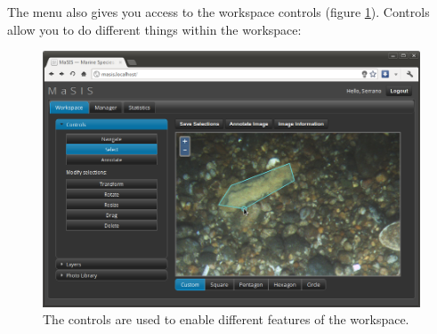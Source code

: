\documentclass[twoside,a4paper]{refart}
\begin{document}
The menu also gives you access to the workspace controls (figure \ref{fig:masis-controls}). Controls allow you to do different things within the workspace:

\begin{figure}[hbtp]
\centering
\includegraphics[width=\textwidth]{screenshots/masis-controls}
\caption{The controls are used to enable different features of the workspace.}
\label{fig:masis-controls}
\end{figure}
\end{document}
